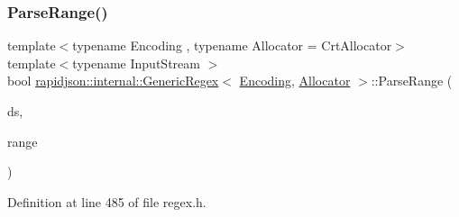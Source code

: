 \subsubsection{\texorpdfstring{ParseRange()}{ParseRange()}}
{\footnotesize\ttfamily template$<$typename Encoding , typename Allocator  = Crt\+Allocator$>$ \\
template$<$typename Input\+Stream $>$ \\
bool \mbox{\hyperlink{classrapidjson_1_1internal_1_1_generic_regex}{rapidjson\+::internal\+::\+Generic\+Regex}}$<$ \mbox{\hyperlink{classrapidjson_1_1_encoding}{Encoding}}, \mbox{\hyperlink{classrapidjson_1_1_allocator}{Allocator}} $>$\+::Parse\+Range (\begin{DoxyParamCaption}\item[{\mbox{\hyperlink{classrapidjson_1_1internal_1_1_decoded_stream}{Decoded\+Stream}}$<$ Input\+Stream, \mbox{\hyperlink{classrapidjson_1_1_encoding}{Encoding}} $>$ \&}]{ds,  }\item[{\mbox{\hyperlink{namespacerapidjson_a44eb33eaa523e36d466b1ced64b85c84}{Size\+Type}} $\ast$}]{range }\end{DoxyParamCaption})\hspace{0.3cm}{\ttfamily [private]}}



Definition at line 485 of file regex.\+h.


